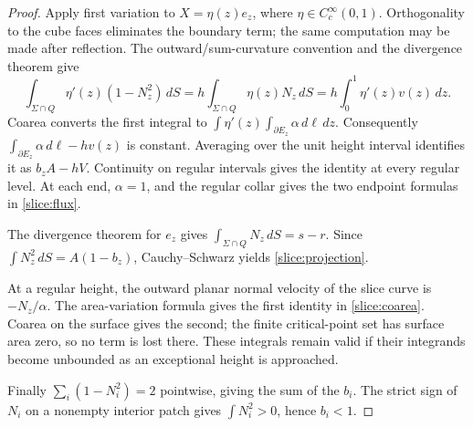 \begin{proof}
Apply first variation to \(X=\eta(z)e_z\), where
\(\eta\in C_c^\infty(0,1)\). Orthogonality to the cube faces eliminates
the boundary term; the same computation may be made after reflection.
The outward/sum-curvature convention and the divergence theorem give
\[
 \int_{\Sigma\cap Q}\eta'(z)(1-N_z^2)\,dS
       =h\int_{\Sigma\cap Q}\eta(z)N_z\,dS
       =h\int_0^1\eta'(z)v(z)\,dz.
\]
Coarea converts the first integral to
\(\int\eta'(z)\int_{\partial E_z}\alpha\,d\ell\,dz\).
Consequently
\(\int_{\partial E_z}\alpha\,d\ell-hv(z)\) is constant.
Averaging over the unit height interval identifies it as \(b_zA-hV\).
Continuity on regular intervals gives the identity at every regular
level. At each end, \(\alpha=1\), and the regular collar gives the
two endpoint formulas in \eqref{slice:flux}.

The divergence theorem for \(e_z\) gives
\(\int_{\Sigma\cap Q}N_z\,dS=s-r\). Since
\(\int N_z^2\,dS=A(1-b_z)\), Cauchy--Schwarz yields
\eqref{slice:projection}.

At a regular height, the outward planar normal velocity of the slice
curve is \(-N_z/\alpha\). The area-variation formula gives the first
identity in \eqref{slice:coarea}. Coarea on the surface gives the second;
the finite critical-point set has surface area zero, so no term is
lost there. These integrals remain valid if their integrands become
unbounded as an exceptional height is approached.

Finally \(\sum_i(1-N_i^2)=2\) pointwise, giving the sum of the \(b_i\).
The strict sign of \(N_i\) on a nonempty interior patch gives
\(\int N_i^2>0\), hence \(b_i<1\).
\end{proof}
